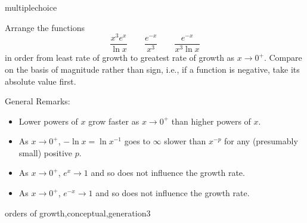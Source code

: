\documentclass{ximera}
\begin{document}
\begin{question}[GrowthOrdZERO005]
\begin{type}
multiplechoice
\end{type}
Arrange the functions 
\[ \frac{x^{3} e^{x}}{\ln{x}} \qquad \frac{e^{- x}}{x^{3}} \qquad \frac{e^{- x}}{x^{3} \ln{x}} \]
in order from least rate of growth to greatest rate of growth as \(x \rightarrow 0^+\). Compare on the basis of magnitude rather than sign, i.e., if a function is negative, take its absolute value first.
\begin{multiplechoice}
 \choicebreak
{}
\end{multiplechoice}
\begin{feedback}
General Remarks:
\begin{itemize} \item Lower powers of \(x\) grow faster as \(x \rightarrow 0^+\) than higher powers of \(x\).
\item As \(x \rightarrow 0^+\), \(-\ln x = \ln x^{-1}\) goes to \(\infty\) slower than \(x^{-p}\) for any (presumably small) positive \(p\).
\item As \(x \rightarrow 0^+\), \(e^{x} \rightarrow 1\) and so does not influence the growth rate.
\item As \(x \rightarrow 0^+\), \(e^{-x} \rightarrow 1\) and so does not influence the growth rate.
\end{itemize}
\end{feedback}
\begin{keywords}
orders of growth,conceptual,generation3
\end{keywords}
\end{question}
\end{document}
